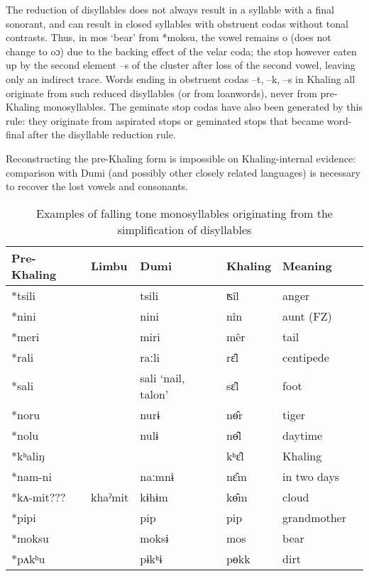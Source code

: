 \documentclass[oldfontcommands,oneside,a4paper,11pt]{article}
\newcommand{\ipa}[1]{{\phon \mbox{#1}}} %
\begin{document}
The reduction of disyllables does not always result in a syllable with a final sonorant, and can result in closed syllables with obstruent codas without tonal contrasts. Thus, in  \ipa{mos}	`bear' from *moksu, the vowel remains \ipa{o} (does not change to \ipa{oɔ}) due to the backing effect of the velar coda; the stop however eaten up by the second element \ipa{--s} of the cluster after loss of the second vowel, leaving only an indirect trace. Words ending in obstruent codas \ipa{--t}, \ipa{--k}, \ipa{--s}   in Khaling all originate from such reduced disyllables (or from loanwords), never from pre-Khaling monosyllables. The geminate stop codas have also been generated by this rule: they originate from aspirated stops or geminated stops that  became word-final after the disyllable reduction rule.

Reconstructing the pre-Khaling form is impossible on Khaling-internal evidence: comparison with Dumi (and possibly other closely related languages) is necessary to recover the lost vowels and consonants.

\begin{table}[H]
\caption{Examples of falling tone monosyllables originating from the simplification of   disyllables} \centering \label{tab:falling.reduction}
\begin{tabular}{llllll}
\toprule
Pre-Khaling	&Limbu	&Dumi	&Khaling	&Meaning\\
\midrule
\ipa{*tsili}			&&	\ipa{tsili}	&	\ipa{ʦîl}	&	anger\\
\ipa{*nini	}		&&	\ipa{nini}	&	\ipa{nîn}		&aunt (FZ)\\
\ipa{*meri}		&&		\ipa{miri}	&	\ipa{mêr}	&	tail\\
\ipa{*rali	}		&&	\ipa{raːli}	&	\ipa{rɛ̂l}		&centipede \\
\ipa{*sali	}		&&	\ipa{sali} `nail, talon'	&	\ipa{sɛ̂l}		&foot \\
\midrule
\ipa{*noru	}		&&	\ipa{nurɨ}	&	\ipa{nɵ̂r}		& tiger \\
\ipa{*nolu	}		&&	\ipa{nulɨ}	&	\ipa{nɵ̂l}		& daytime \\
\midrule
\ipa{*kʰaliŋ}				&&&	\ipa{kʰɛ‍̂l}	&	Khaling\\
\ipa{*nam-ni}	&&		\ipa{naːmnɨ	}&	\ipa{nɛ̂m}	&	in two days\\
\midrule
\ipa{*kʌ-mit}???	& \ipa{khaˀmit} & \ipa{kɨhɨm}	&	\ipa{kɵ̂m}		&cloud\\
\midrule
\ipa{*pipi} 	&   & \ipa{pip}	&	\ipa{pip}		& grandmother \\
\ipa{*moksu} 	&   & \ipa{moksɨ}	&	\ipa{mos}		&bear \\
\ipa{*pʌkʰu} 	&   & \ipa{pɨkʰɨ}	&	\ipa{pɵkk}		& dirt \\
\bottomrule
\end{tabular}
\end{table}
\end{document}
